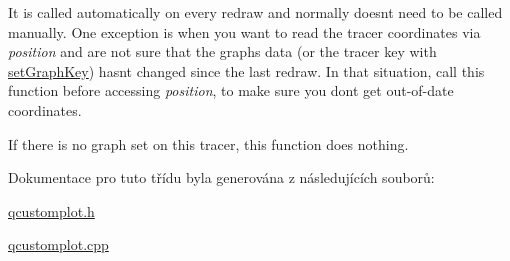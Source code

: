 It is called automatically on every redraw and normally doesn\textquotesingle{}t need to be called manually. One exception is when you want to read the tracer coordinates via {\itshape position} and are not sure that the graph\textquotesingle{}s data (or the tracer key with \hyperlink{classQCPItemTracer_a6840143b42f3b685cedf7c6d83a704c8}{set\+Graph\+Key}) hasn\textquotesingle{}t changed since the last redraw. In that situation, call this function before accessing {\itshape position}, to make sure you don\textquotesingle{}t get out-\/of-\/date coordinates.

If there is no graph set on this tracer, this function does nothing. 

Dokumentace pro tuto třídu byla generována z následujících souborů\+:\begin{DoxyCompactItemize}
\item 
\hyperlink{qcustomplot_8h}{qcustomplot.\+h}\item 
\hyperlink{qcustomplot_8cpp}{qcustomplot.\+cpp}\end{DoxyCompactItemize}

